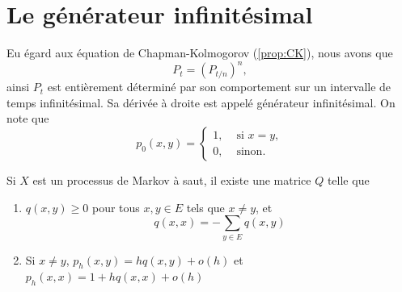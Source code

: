 \section{Le générateur infinitésimal}
Eu égard aux équation de Chapman-Kolmogorov (\cf \cref{prop:CK}), nous avons que 
$$
P_t = (P_{t/n})^n,
$$
ainsi $P_t$ est entièrement déterminé par son comportement sur un intervalle de temps infinitésimal. Sa dérivée à droite est appelé générateur infinitésimal. On note que 
$$
p_0(x,y) = \begin{cases}
1,&\text{ si }x=y,\\
0,& \text{ sinon.}
\end{cases}
$$ 
\begin{theo}\label{theo:infinitesimal_generator}
Si $X$ est un processus de Markov à saut, il existe une matrice $Q$ telle que 
\begin{enumerate}
	\item $q(x,y)\geq 0$ pour tous $x,y\in E$ tels que $x\neq y$, et 
	$$
	q(x,x) = -\sum_{y\in E}q(x,y)
	$$
	\item Si $x\neq y$, $p_h(x,y) = hq(x,y) + o(h)$ et $p_h(x,x) = 1 + hq(x,x) + o(h)$
\end{enumerate}
\end{theo}
